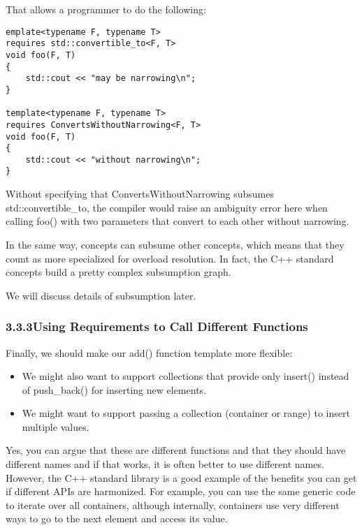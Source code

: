 That allows a programmer to do the following:

\begin{lstlisting}[style=styleCXX]
emplate<typename F, typename T>
requires std::convertible_to<F, T>
void foo(F, T)
{
	std::cout << "may be narrowing\n";
}

template<typename F, typename T>
requires ConvertsWithoutNarrowing<F, T>
void foo(F, T)
{
	std::cout << "without narrowing\n";
}
\end{lstlisting}

Without specifying that ConvertsWithoutNarrowing subsumes std::convertible\_to, the compiler would raise an ambiguity error here when calling foo() with two parameters that convert to each other without narrowing.

In the same way, concepts can subsume other concepts, which means that they count as more specialized for overload resolution. In fact, the C++ standard concepts build a pretty complex subsumption graph.

We will discuss details of subsumption later.

\subsubsection*{ 3.3.3\hspace{0.2cm}Using Requirements to Call Different Functions}

Finally, we should make our add() function template more flexible:

\begin{itemize}
\item
We might also want to support collections that provide only insert() instead of push\_back() for inserting new elements.

\item
We might want to support passing a collection (container or range) to insert multiple values.
\end{itemize}

Yes, you can argue that these are different functions and that they should have different names and if that works, it is often better to use different names. However, the C++ standard library is a good example of the benefits you can get if different APIs are harmonized. For example, you can use the same generic code to iterate over all containers, although internally, containers use very different ways to go to the next element and access its value.

